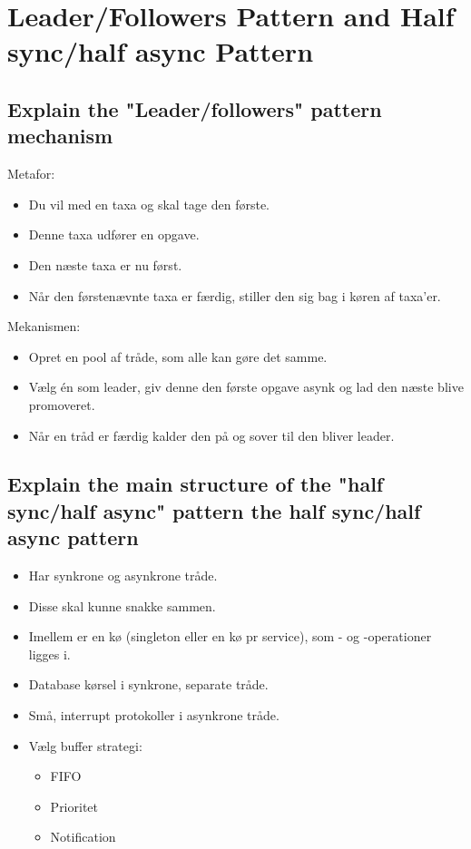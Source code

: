 \documentclass{article}
\begin{document}
\newpage
\section{Leader/Followers Pattern and Half sync/half async Pattern}

\subsection{Explain the "Leader/followers" pattern mechanism}
Metafor:
\vspace{-10pt}
\begin{itemize}
	\item Du vil med en taxa og skal tage den første.
	\item Denne taxa udfører en opgave.
	\item Den næste taxa er nu først.
	\item Når den førstenævnte taxa er færdig, stiller den sig bag i køren af taxa'er.
\end{itemize}

Mekanismen:
\vspace{-10pt}
\begin{itemize}
	\item Opret en pool af tråde, som alle kan gøre det samme.
	\item Vælg én som leader, giv denne den første opgave asynk og lad den næste blive promoveret.
	\item Når en tråd er færdig kalder den  på  og sover til den bliver leader.
\end{itemize}


\subsection{Explain the main structure of the "half sync/half async" pattern the half sync/half async pattern}

\begin{itemize}
	\item Har synkrone og asynkrone tråde.
	\item Disse skal kunne snakke sammen.
	\item Imellem er en kø (singleton eller en kø pr service), som - og -operationer ligges i.
	\item Database kørsel i synkrone, separate tråde.
	\item Små, interrupt protokoller i asynkrone tråde.
	\item Vælg buffer strategi:
	\begin{itemize}
		\item FIFO
		\item Prioritet
		\item Notification 
	\end{itemize}
\end{itemize}
\end{document}
